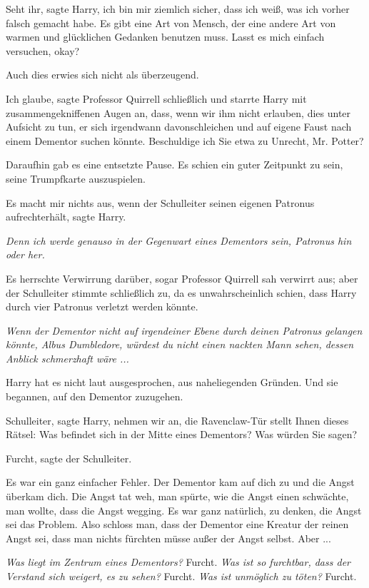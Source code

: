 \glqq{}Seht ihr\grqq{}, sagte Harry, \glqq{}ich bin mir ziemlich sicher, dass ich
weiß, was ich vorher falsch gemacht habe. Es gibt eine Art von Mensch, der eine
andere Art von warmen und glücklichen Gedanken benutzen muss. Lasst es mich
einfach versuchen, okay?\grqq{}

Auch dies erwies sich nicht als überzeugend.

\glqq{}Ich glaube\grqq{}, sagte Professor Quirrell schließlich und starrte Harry
mit zusammengekniffenen Augen an, \glqq{}dass, wenn wir ihm nicht erlauben, dies
unter Aufsicht zu tun, er sich irgendwann davonschleichen und auf eigene Faust
nach einem Dementor suchen könnte. Beschuldige ich Sie etwa zu Unrecht, Mr.
Potter?\grqq{}

Daraufhin gab es eine entsetzte Pause. Es schien ein guter Zeitpunkt zu sein,
seine Trumpfkarte auszuspielen.

\glqq{}Es macht mir nichts aus, wenn der Schulleiter seinen eigenen Patronus
aufrechterhält\grqq{}, sagte Harry.

\emph{Denn ich werde genauso in der Gegenwart eines Dementors sein, Patronus
hin oder her.}

Es herrschte Verwirrung darüber, sogar Professor Quirrell sah verwirrt aus; aber
der Schulleiter stimmte schließlich zu, da es unwahrscheinlich schien, dass
Harry durch vier Patronus verletzt werden könnte.

\emph{Wenn der Dementor nicht auf irgendeiner Ebene durch deinen Patronus
gelangen könnte, Albus Dumbledore, würdest du nicht einen nackten Mann sehen,
dessen Anblick schmerzhaft wäre ...}

Harry hat es nicht laut ausgesprochen, aus naheliegenden Gründen. Und sie
begannen, auf den Dementor zuzugehen.

\glqq{}Schulleiter\grqq{}, sagte Harry, \glqq{}nehmen wir an, die Ravenclaw-Tür
stellt Ihnen dieses Rätsel: Was befindet sich in der Mitte eines Dementors? Was
würden Sie sagen?\grqq{}

\glqq{}Furcht\grqq{}, sagte der Schulleiter.

Es war ein ganz einfacher Fehler. Der Dementor kam auf dich zu und die Angst
überkam dich. Die Angst tat weh, man spürte, wie die Angst einen schwächte, man
wollte, dass die Angst wegging. Es war ganz natürlich, zu denken, die Angst sei
das Problem. Also schloss man, dass der Dementor eine Kreatur der reinen Angst
sei, dass man nichts fürchten müsse außer der Angst selbst. Aber ...

\emph{Was liegt im Zentrum eines Dementors?}
Furcht.
\emph{Was ist so furchtbar, dass der Verstand sich weigert, es zu sehen?}
Furcht.
\emph{Was ist unmöglich zu töten?}
Furcht.

